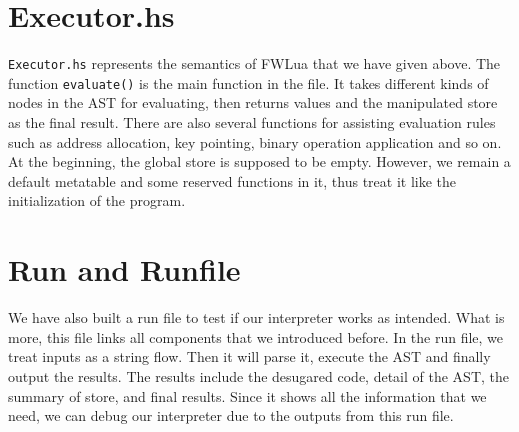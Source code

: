 \section{Executor.hs}
{\tt Executor.hs} represents the semantics of FWLua that we have given above. The function {\tt evaluate()} is the main function in the file. It takes different kinds of nodes in the AST for evaluating, then returns values and the manipulated store as the final result. There are also several functions for assisting evaluation rules
such as address allocation, key pointing, binary operation application and so on. At the beginning, the global store is supposed to be empty.
However, we remain a default metatable and some reserved functions in it, thus treat it like the initialization of the program.

\section{Run and Runfile}
We have also built a run file to test if our interpreter works as intended. What is more, this file links all components that we introduced before. In the run file, we treat inputs as a string flow. Then it will parse it, execute the AST and finally output the results. The results include the desugared code, detail of the AST, the summary of store, and final results. Since it shows all the information that we need, we can debug our interpreter due to the outputs from this run file.

